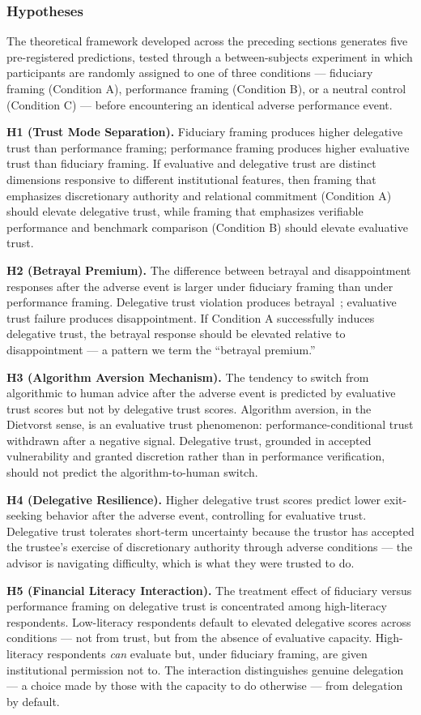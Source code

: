 \subsubsection{Hypotheses}
\label{subsubsec:hypotheses}

The theoretical framework developed across the preceding sections generates five pre-registered predictions, tested through a between-subjects experiment in which participants are randomly assigned to one of three conditions --- fiduciary framing (Condition A), performance framing (Condition B), or a neutral control (Condition C) --- before encountering an identical adverse performance event.

\textbf{H1 (Trust Mode Separation).} Fiduciary framing produces higher delegative trust than performance framing; performance framing produces higher evaluative trust than fiduciary framing. If evaluative and delegative trust are distinct dimensions responsive to different institutional features, then framing that emphasizes discretionary authority and relational commitment (Condition A) should elevate delegative trust, while framing that emphasizes verifiable performance and benchmark comparison (Condition B) should elevate evaluative trust.

\textbf{H2 (Betrayal Premium).} The difference between betrayal and disappointment responses after the adverse event is larger under fiduciary framing than under performance framing. Delegative trust violation produces betrayal~\citep{Holton1994}; evaluative trust failure produces disappointment. If Condition A successfully induces delegative trust, the betrayal response should be elevated relative to disappointment --- a pattern we term the ``betrayal premium.''

\textbf{H3 (Algorithm Aversion Mechanism).} The tendency to switch from algorithmic to human advice after the adverse event is predicted by evaluative trust scores but not by delegative trust scores. Algorithm aversion, in the Dietvorst sense, is an evaluative trust phenomenon: performance-conditional trust withdrawn after a negative signal. Delegative trust, grounded in accepted vulnerability and granted discretion rather than in performance verification, should not predict the algorithm-to-human switch.

\textbf{H4 (Delegative Resilience).} Higher delegative trust scores predict lower exit-seeking behavior after the adverse event, controlling for evaluative trust. Delegative trust tolerates short-term uncertainty because the trustor has accepted the trustee's exercise of discretionary authority through adverse conditions --- the advisor is navigating difficulty, which is what they were trusted to do.

\textbf{H5 (Financial Literacy Interaction).} The treatment effect of fiduciary versus performance framing on delegative trust is concentrated among high-literacy respondents. Low-literacy respondents default to elevated delegative scores across conditions --- not from trust, but from the absence of evaluative capacity. High-literacy respondents \textit{can} evaluate but, under fiduciary framing, are given institutional permission not to. The interaction distinguishes genuine delegation --- a choice made by those with the capacity to do otherwise --- from delegation by default.
